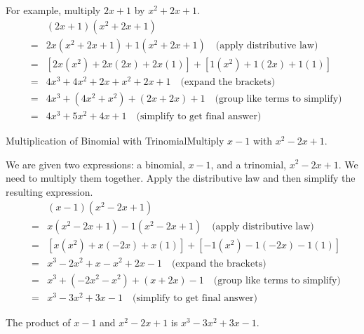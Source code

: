 \documentclass[10pt,a4paper,titlepage,twoside,openright]{report}
\begin{document}
For example, multiply $2x+1$ by $x^2+2x+1$.
\begin{eqnarray*}
&\ &(2x+1)(x^2+2x+1)\\
&=&2x(x^2+2x+1) + 1(x^2+2x+1)\quad\mbox{(apply distributive law)}\\
&=&[2x(x^2)+2x(2x)+2x(1)]+[1(x^2)+1(2x)+1(1)]\\
&=&4x^3+4x^2+2x+x^2+2x+1 \quad\mbox{(expand the brackets)}\\
&=&4x^3+(4x^2+x^2)+(2x+2x)+1 \quad\mbox{(group like terms to simplify)}\\
&=&4x^3+5x^2+4x+1 \quad\mbox{(simplify to get final answer)}
\end{eqnarray*}


\begin{wex}{Multiplication of Binomial with Trinomial}{Multiply $x-1$ with $x^2-2x+1$.}{
We are given two expressions: a binomial, $x-1$, and a trinomial, $x^2-2x+1$. We need to multiply them together.
Apply the distributive law and then simplify the resulting expression.
\begin{eqnarray*}
&\ &(x-1)(x^2-2x+1)\\
&=&x(x^2-2x+1) -1(x^2-2x+1)\quad\mbox{(apply distributive law)}\\
&=&[x(x^2)+x(-2x)+x(1)]+[-1(x^2)-1(-2x)-1(1)]\\
&=&x^3-2x^2+x-x^2+2x-1 \quad\mbox{(expand the brackets)}\\
&=&x^3+ (-2x^2-x^2)+(x+2x)-1 \quad\mbox{(group like terms to simplify)}\\
&=&x^3 -3x^2+3x-1 \quad\mbox{(simplify to get final answer)}
\end{eqnarray*}

The product of $x-1$ and $x^2-2x+1$ is $x^3 -3x^2+3x-1$.}
\end{wex}
\end{document}
